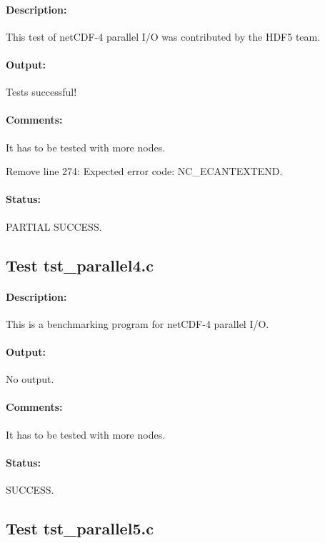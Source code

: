 \paragraph{Description:} This test of netCDF-4 parallel I/O was contributed by the HDF5 team.

\paragraph{Output:} Tests successful!

\paragraph{Comments:} It has to be tested with more nodes.

Remove line 274: Expected error code: NC\_ECANTEXTEND.

\paragraph{Status:} PARTIAL SUCCESS.

\subsection{Test tst\_parallel4.c}

\paragraph{Description:} This is a benchmarking program for netCDF-4 parallel I/O.

\paragraph{Output:} No output.

\paragraph{Comments:} It has to be tested with more nodes.

\paragraph{Status:} SUCCESS.

\subsection{Test tst\_parallel5.c}

